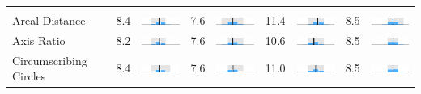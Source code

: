 \begin{table}
\begin{tabular}{l rm{7em} rm{7em} rm{7em} rm{7em}}
\\ \hline \\ 
Areal Distance         &   8.4 &       \includegraphics[width=7em]{mini_hist/PA_2000_dist_a} &   7.6 &       \includegraphics[width=7em]{mini_hist/PA_2004_dist_a} &  11.4 &       \includegraphics[width=7em]{mini_hist/PA_2008_dist_a} &   8.5 &       \includegraphics[width=7em]{mini_hist/PA_2012_dist_a} \\
Axis Ratio             &   8.2 &   \includegraphics[width=7em]{mini_hist/PA_2000_axis_ratio} &   7.6 &   \includegraphics[width=7em]{mini_hist/PA_2004_axis_ratio} &  10.6 &   \includegraphics[width=7em]{mini_hist/PA_2008_axis_ratio} &   8.5 &   \includegraphics[width=7em]{mini_hist/PA_2012_axis_ratio} \\
Circumscribing Circles &   8.4 &        \includegraphics[width=7em]{mini_hist/PA_2000_reock} &   7.6 &        \includegraphics[width=7em]{mini_hist/PA_2004_reock} &  11.0 &        \includegraphics[width=7em]{mini_hist/PA_2008_reock} &   8.5 &        \includegraphics[width=7em]{mini_hist/PA_2012_reock} \\

\end{tabular}
\end{table}
